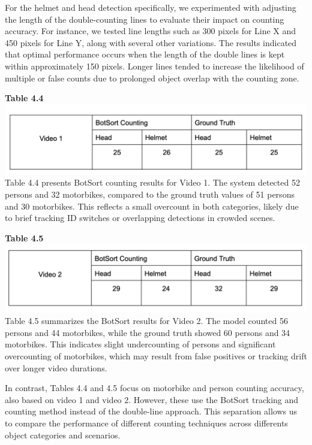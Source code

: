 \vspace{1em}
For the helmet and head detection specifically, we experimented with adjusting the length of the double-counting lines to evaluate their impact on counting accuracy. For instance, we tested line lengths such as 300 pixels for Line X and 450 pixels for Line Y, along with several other variations. The results indicated that optimal performance occurs when the length of the double lines is kept within approximately 150 pixels. Longer lines tended to increase the likelihood of multiple or false counts due to prolonged object overlap with the counting zone.


\vspace{0.5em}
\noindent\textbf{Table 4.4} \\
\includegraphics[width=1\textwidth]{test3.png}
\noindent\hspace{2.5em}Table 4.4 presents BotSort counting results for Video 1. The system detected 52 persons and 32 motorbikes, compared to the ground truth values of 51 persons and 30 motorbikes. This reflects a small overcount in both categories, likely due to brief tracking ID switches or overlapping detections in crowded scenes.

\newpage
\vspace{0.5em}
\noindent\textbf{Table 4.5} \\
\includegraphics[width=1\textwidth]{test4.png}
\noindent\hspace{2.5em}Table 4.5 summarizes the BotSort results for Video 2. The model counted 56 persons and 44 motorbikes, while the ground truth showed 60 persons and 34 motorbikes. This indicates slight undercounting of persons and significant overcounting of motorbikes, which may result from false positives or tracking drift over longer video durations.


\vspace{1em}
\noindent\hspace{2.5em}In contrast, Tables 4.4 and 4.5 focus on motorbike and person counting accuracy, also based on video 1 and video 2. However, these use the BotSort tracking and counting method instead of the double-line approach. This separation allows us to compare the performance of different counting techniques across differents object categories and scenarios.

